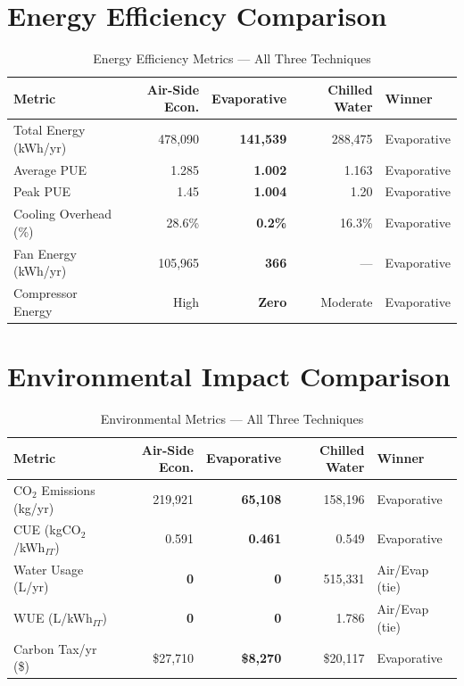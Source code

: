 \documentclass[12pt,a4paper]{report}
\begin{document}
\section{Energy Efficiency Comparison}

\begin{table}[H]
\centering
\caption{Energy Efficiency Metrics --- All Three Techniques}
\label{tab:compare_energy}
\renewcommand{\arraystretch}{1.4}
\begin{tabular}{lrrrl}
\toprule
\textbf{Metric} & \textbf{Air-Side Econ.} & \textbf{Evaporative} & \textbf{Chilled Water} & \textbf{Winner} \\
\midrule
Total Energy (kWh/yr) & 478{,}090 & \textbf{141{,}539} & 288{,}475 & Evaporative \\
Average PUE & 1.285 & \textbf{1.002} & 1.163 & Evaporative \\
Peak PUE & 1.45 & \textbf{1.004} & 1.20 & Evaporative \\
Cooling Overhead (\%) & 28.6\% & \textbf{0.2\%} & 16.3\% & Evaporative \\
Fan Energy (kWh/yr) & 105{,}965 & \textbf{366} & --- & Evaporative \\
Compressor Energy & High & \textbf{Zero} & Moderate & Evaporative \\
\bottomrule
\end{tabular}
\end{table}

\section{Environmental Impact Comparison}

\begin{table}[H]
\centering
\caption{Environmental Metrics --- All Three Techniques}
\label{tab:compare_env}
\renewcommand{\arraystretch}{1.4}
\begin{tabular}{lrrrl}
\toprule
\textbf{Metric} & \textbf{Air-Side Econ.} & \textbf{Evaporative} & \textbf{Chilled Water} & \textbf{Winner} \\
\midrule
CO$_2$ Emissions (kg/yr) & 219{,}921 & \textbf{65{,}108} & 158{,}196 & Evaporative \\
CUE (kgCO$_2$/kWh$_{IT}$) & 0.591 & \textbf{0.461} & 0.549 & Evaporative \\
Water Usage (L/yr) & \textbf{0} & \textbf{0} & 515{,}331 & Air/Evap (tie) \\
WUE (L/kWh$_{IT}$) & \textbf{0} & \textbf{0} & 1.786 & Air/Evap (tie) \\
Carbon Tax/yr (\$) & \$27{,}710 & \textbf{\$8{,}270} & \$20{,}117 & Evaporative \\
\bottomrule
\end{tabular}
\end{table}
\end{document}

